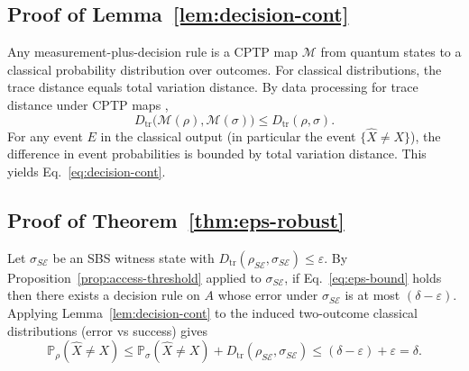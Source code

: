 \documentclass[aps,pra,twocolumn,superscriptaddress,nofootinbib]{revtex4-2}
\newcommand{\cE}{\mathcal{E}}
\newcommand{\Dtr}{D_{\mathrm{tr}}}
\newcommand{\1}{\mathbf{1}}
\newcommand{\Prob}{\mathbb{P}}
\theoremstyle{definition}
\theoremstyle{plain}
\begin{document}
\subsection{Proof of Lemma~\ref{lem:decision-cont}}

Any measurement-plus-decision rule is a CPTP map $\mathcal{M}$ from quantum states to a classical probability distribution over outcomes.
For classical distributions, the trace distance equals total variation distance.
By data processing for trace distance under CPTP maps \cite{Watrous2018},
\begin{equation}
\Dtr\bigl(\mathcal{M}(\rho),\mathcal{M}(\sigma)\bigr)\le \Dtr(\rho,\sigma).
\end{equation}
For any event $E$ in the classical output (in particular the event $\{\widehat{X}\neq X\}$), the difference in event probabilities is bounded by total variation distance.
This yields Eq.~\eqref{eq:decision-cont}.

\subsection{Proof of Theorem~\ref{thm:eps-robust}}

Let $\sigma_{S\cE}$ be an SBS witness state with $\Dtr(\rho_{S\cE},\sigma_{S\cE})\le\varepsilon$.
By Proposition~\ref{prop:access-threshold} applied to $\sigma_{S\cE}$, if Eq.~\eqref{eq:eps-bound} holds then there exists a decision rule on $A$ whose error under $\sigma_{S\cE}$ is at most $(\delta-\varepsilon)$.
Applying Lemma~\ref{lem:decision-cont} to the induced two-outcome classical distributions (error vs success) gives
\begin{equation}
\Prob_{\rho}(\widehat{X}\neq X)
\le \Prob_{\sigma}(\widehat{X}\neq X)+\Dtr(\rho_{S\cE},\sigma_{S\cE})
\le (\delta-\varepsilon)+\varepsilon
=\delta.
\end{equation}



\end{document}
